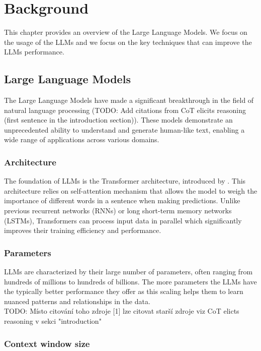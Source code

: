 \chapter{Background}

This chapter provides an overview of the Large Language Models. We focus on the usage of the LLMs and we focus on the key techniques that can improve the LLMs performance.


\section{Large Language Models}

The Large Language Models have made a significant breakthrough in the field of natural language processing (TODO: Add citations from CoT elicits reasoning (first sentence in the introduction section)). These models demonstrate an unprecedented ability to understand and generate human-like text, enabling a wide range of applications across various domains.


\subsection{Architecture}

The foundation of LLMs is the Transformer architecture, introduced by \citet{Vaswani2017}. This architecture relies on self-attention mechanism that allows the model to weigh the importance of different words in a sentence when making predictions. Unlike previous recurrent networks (RNNs) or long short-term memory networks (LSTMs), Transformers can process input data in parallel which significantly improves their training efficiency and performance.


\subsection{Parameters}

LLMs are characterized by their large number of parameters, often ranging from hundreds of millions to hundreds of billions. The more parameters the LLMs have the typically better performance they offer \cite{Zhao2023} as this scaling helps them to learn nuanced patterns and relationships in the data. \\

TODO: Místo citování toho zdroje [1] lze citovat starší zdroje viz CoT elicts reasoning v sekci "introduction"


\subsection{Context window size}


